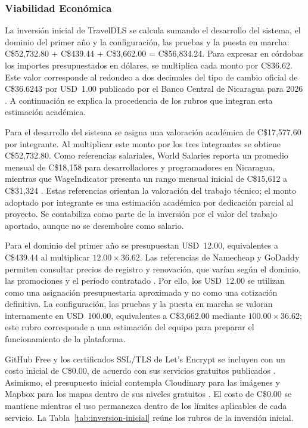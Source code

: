 \subsubsection{Viabilidad Económica}

La inversión inicial de TravelDLS se calcula sumando el desarrollo del sistema, el dominio del primer año y la configuración, las pruebas y la puesta en marcha: C\$52,732.80 + C\$439.44 + C\$3,662.00 = C\$56,834.24. Para expresar en córdobas los importes presupuestados en dólares, se multiplica cada monto por C\$36.62. Este valor corresponde al redondeo a dos decimales del tipo de cambio oficial de C\$36.6243 por USD~1.00 publicado por el Banco Central de Nicaragua para 2026 \parencite{bcn2026tipocambio}. A continuación se explica la procedencia de los rubros que integran esta estimación académica.

Para el desarrollo del sistema se asigna una valoración académica de C\$17,577.60 por integrante. Al multiplicar este monto por los tres integrantes se obtiene C\$52,732.80. Como referencias salariales, World Salaries reporta un promedio mensual de C\$18,158 para desarrolladores y programadores en Nicaragua, mientras que WageIndicator presenta un rango mensual inicial de C\$15,612 a C\$31,324 \parencite{worldsalaries2026developer,wageindicator2026desarrolladores}. Estas referencias orientan la valoración del trabajo técnico; el monto adoptado por integrante es una estimación académica por dedicación parcial al proyecto. Se contabiliza como parte de la inversión por el valor del trabajo aportado, aunque no se desembolse como salario.

Para el dominio del primer año se presupuestan USD~12.00, equivalentes a C\$439.44 al multiplicar $12.00 \times 36.62$. Las referencias de Namecheap y GoDaddy permiten consultar precios de registro y renovación, que varían según el dominio, las promociones y el período contratado \parencite{namecheapdomain,godaddy2026domain}. Por ello, los USD~12.00 se utilizan como una asignación presupuestaria aproximada y no como una cotización definitiva. La configuración, las pruebas y la puesta en marcha se valoran internamente en USD~100.00, equivalentes a C\$3,662.00 mediante $100.00 \times 36.62$; este rubro corresponde a una estimación del equipo para preparar el funcionamiento de la plataforma.

GitHub Free y los certificados SSL/TLS de Let's Encrypt se incluyen con un costo inicial de C\$0.00, de acuerdo con sus servicios gratuitos publicados \parencite{githubpricing,letsencrypt2021about}. Asimismo, el presupuesto inicial contempla Cloudinary para las imágenes y Mapbox para los mapas dentro de sus niveles gratuitos \parencite{cloudinarypricing,mapboxpricing}. El costo de C\$0.00 se mantiene mientras el uso permanezca dentro de los límites aplicables de cada servicio. La Tabla~\ref{tab:inversion-inicial} reúne los rubros de la inversión inicial.

